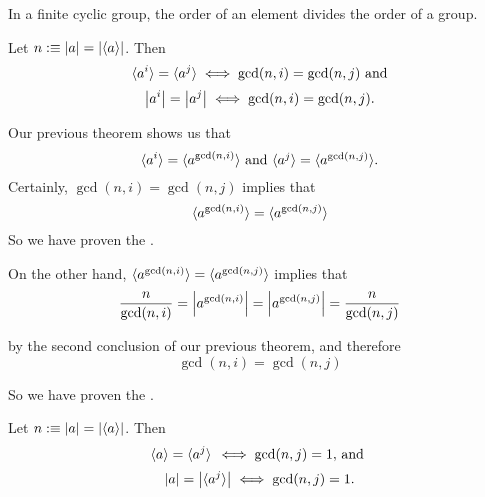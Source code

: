 \setcounter{corollary}{0}

\begin{corollary}
  In a finite cyclic group, the order of an element divides the order of a group.
\end{corollary}

\begin{corollary}[Criterion for $\la a^i \ra = \la a^j \ra$ and $\abs{a^i} = \abs{a^j}$]
  Let $n:\equiv \abs{a}=\abs{\langle a \rangle}$. Then
  \begin{equation}
    \la a^i \ra = \la a^j \ra \iff \gcd(n,i) = \gcd(n,j) $ and$
  \end{equation}
  \begin{equation}
    \abs{a^i} = \abs{a^j} \iff \gcd(n,i)=\gcd(n,j).
  \end{equation}
\end{corollary}
\begin{prf}
  Our previous theorem shows us that
  \begin{equation}
    \la a^i \ra = \la a^{\gcd(n,i)}\ra $ and $ \la a^j \ra = \la  a^{\gcd(n,j)} \ra.
  \end{equation}
  Certainly, $\gcd(n,i) = \gcd(n,j)$ implies that
  \begin{equation}
    \langle a^{\gcd(n,i)} \rangle = \langle a^{\gcd(n,j)} \rangle
  \end{equation}
  So we have proven the .

  On the other hand, $\langle a^{\gcd(n,i)} \rangle = \langle a^{\gcd(n,j)} \rangle$ implies that
  \begin{equation}
    \frac{n}{\gcd(n,i)}=\abs{a^{\gcd(n,i)} } = \abs{ a^{\gcd(n,j)} }=\frac{n}{\gcd(n,j)}
  \end{equation}

  by the second conclusion of our previous theorem, and therefore
  \begin{equation}
    \gcd(n,i) = \gcd(n,j)
  \end{equation}

  So we have proven the .
\end{prf}

\begin{corollary}
  Let $n:\equiv \abs{a}=\abs{\langle a \rangle}$. Then
  \begin{equation}
    \la a \ra = \la a^j \ra \, \iff \gcd (n,j) = 1, $ and $
  \end{equation}
  \begin{equation}
    \abs{a} = \abs{\langle a^j \rangle} \iff \gcd (n,j) = 1.
  \end{equation}
\end{corollary}

